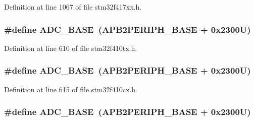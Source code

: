 Definition at line 1067 of file stm32f417xx.\+h.

\subsubsection[{\texorpdfstring{A\+D\+C\+\_\+\+B\+A\+SE}{ADC_BASE}}]{\setlength{\rightskip}{0pt plus 5cm}\#define A\+D\+C\+\_\+\+B\+A\+SE~({\bf A\+P\+B2\+P\+E\+R\+I\+P\+H\+\_\+\+B\+A\+SE} + 0x2300\+U)}\hypertarget{group___peripheral__registers__structures_gad06cb9e5985bd216a376f26f22303cd6}{}\label{group___peripheral__registers__structures_gad06cb9e5985bd216a376f26f22303cd6}


Definition at line 610 of file stm32f410tx.\+h.

\subsubsection[{\texorpdfstring{A\+D\+C\+\_\+\+B\+A\+SE}{ADC_BASE}}]{\setlength{\rightskip}{0pt plus 5cm}\#define A\+D\+C\+\_\+\+B\+A\+SE~({\bf A\+P\+B2\+P\+E\+R\+I\+P\+H\+\_\+\+B\+A\+SE} + 0x2300\+U)}\hypertarget{group___peripheral__registers__structures_gad06cb9e5985bd216a376f26f22303cd6}{}\label{group___peripheral__registers__structures_gad06cb9e5985bd216a376f26f22303cd6}


Definition at line 615 of file stm32f410cx.\+h.

\subsubsection[{\texorpdfstring{A\+D\+C\+\_\+\+B\+A\+SE}{ADC_BASE}}]{\setlength{\rightskip}{0pt plus 5cm}\#define A\+D\+C\+\_\+\+B\+A\+SE~({\bf A\+P\+B2\+P\+E\+R\+I\+P\+H\+\_\+\+B\+A\+SE} + 0x2300\+U)}\hypertarget{group___peripheral__registers__structures_gad06cb9e5985bd216a376f26f22303cd6}{}\label{group___peripheral__registers__structures_gad06cb9e5985bd216a376f26f22303cd6}


